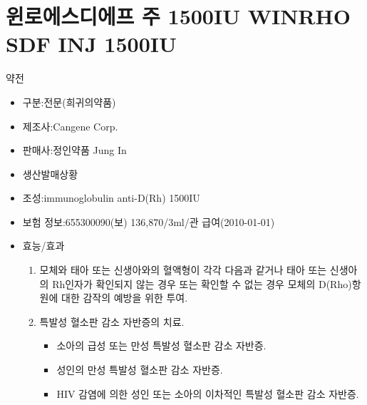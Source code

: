 \section{윈로에스디에프 주 1500IU WINRHO SDF INJ 1500IU }	\label{WinRhoInj}
\begin{Adoing}{약전}
\begin{itemize}\tightlist
\item 구분:전문(희귀의약품)
\item 제조사:Cangene Corp.	
\item 판매사:정인약품 Jung In	
\item 생산발매상황
\item 조성:immunoglobulin anti-D(Rh) 1500IU 
\item 보험 정보:655300090(보) 136,870/3ml/관 급여(2010-01-01)
\item 효능/효과
	\begin{enumerate}\tightlist
	\item 모체와 태아 또는 신생아와의 혈액형이 각각 다음과 같거나 태아 또는 신생아의 Rh인자가 확인되지 않는 경우 또는 확인할 수 없는 경우 모체의 D(Rho)항원에 대한 감작의 예방을 위한 투여. 
	\item 특발성 혈소판 감소 자반증의 치료. 
		\begin{itemize}\tightlist
		\item 소아의 급성 또는 만성 특발성 혈소판 감소 자반증. 
		\item 성인의 만성 특발성 혈소판 감소 자반증. 
		\item HIV 감염에 의한 성인 또는 소아의 이차적인 특발성 혈소판 감소 자반증.
		\end{itemize}
	\end{enumerate}
\end{itemize}
\end{Adoing}

